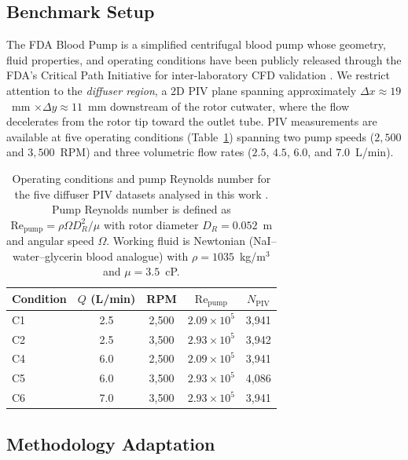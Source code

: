 \documentclass[12pt,a4paper]{article}
\newcommand{\Reyn}{\mathrm{Re}}    %
\begin{document}
\subsection{Benchmark Setup}
\label{sec:pump_setup}

The FDA Blood Pump is a simplified centrifugal blood pump whose
geometry, fluid properties, and operating conditions have been
publicly released through the FDA's Critical Path Initiative for
inter-laboratory CFD validation \cite{Hariharan2018BloodPump}. We
restrict attention to the \emph{diffuser region}, a 2D PIV plane
spanning approximately
$\Delta x \approx 19$~mm $\times \Delta y \approx 11$~mm
downstream of the rotor cutwater, where the flow decelerates from
the rotor tip toward the outlet tube. PIV measurements are
available at five operating conditions (Table~\ref{tab:pump_ops})
spanning two pump speeds ($2{,}500$ and $3{,}500$~RPM) and three
volumetric flow rates ($2.5$, $4.5$, $6.0$, and $7.0$~L/min).

\begin{table}[H]
  \centering
  \caption{
    Operating conditions and pump Reynolds number for the five
    diffuser PIV datasets analysed in this work
    \cite{Hariharan2018BloodPump}. Pump Reynolds number is defined
    as $\Reyn_{\text{pump}} = \rho \Omega D_R^2 / \mu$ with rotor
    diameter $D_R = 0.052$~m and angular speed $\Omega$. Working
    fluid is Newtonian (NaI--water--glycerin blood analogue) with
    $\rho = 1035$~kg/m$^3$ and $\mu = 3.5$~cP.
  }
  \label{tab:pump_ops}
  \begin{tabular}{lcccc}
    \toprule
    Condition & $Q$ (L/min) & RPM & $\Reyn_{\text{pump}}$ & $N_{\text{PIV}}$ \\
    \midrule
    C1 & 2.5 & 2{,}500 & $2.09 \times 10^5$ & 3{,}941 \\
    C2 & 2.5 & 3{,}500 & $2.93 \times 10^5$ & 3{,}942 \\
    C4 & 6.0 & 2{,}500 & $2.09 \times 10^5$ & 3{,}941 \\
    C5 & 6.0 & 3{,}500 & $2.93 \times 10^5$ & 4{,}086 \\
    C6 & 7.0 & 3{,}500 & $2.93 \times 10^5$ & 3{,}941 \\
    \bottomrule
  \end{tabular}
\end{table}

\subsection{Methodology Adaptation}
\label{sec:pump_methodology}
\end{document}
